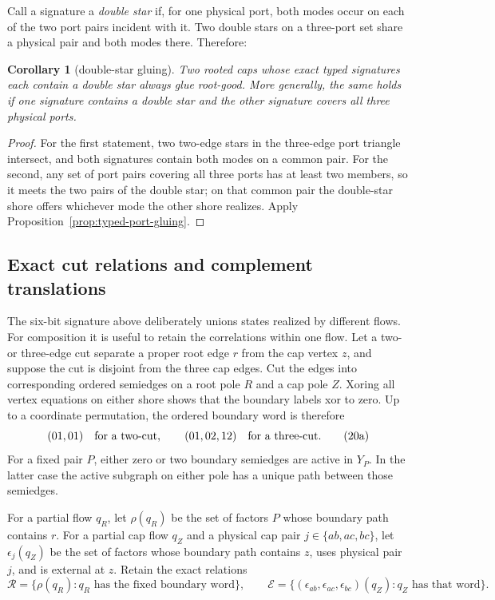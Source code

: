 \documentclass[11pt]{article}
\newtheorem{corollary}[theorem]{Corollary}
\theoremstyle{definition}
\theoremstyle{remark}
\begin{document}
Call a signature a \emph{double star} if, for one physical port, both modes
occur on each of the two port pairs incident with it.  Two double stars on
a three-port set share a physical pair and both modes there.  Therefore:

\begin{corollary}[double-star gluing]\label{cor:double-star-gluing}
Two rooted caps whose exact typed signatures each contain a double star
always glue root-good.  More generally, the same holds if one signature
contains a double star and the other signature covers all three physical
ports.
\end{corollary}

\begin{proof}
For the first statement, two two-edge stars in the three-edge port triangle
intersect, and both signatures contain both modes on a common pair.  For
the second, any set of port pairs covering all three ports has at least two
members, so it meets the two pairs of the double star; on that common pair
the double-star shore offers whichever mode the other shore realizes.
Apply Proposition~\ref{prop:typed-port-gluing}.
\end{proof}

\subsection{Exact cut relations and complement translations}

The six-bit signature above deliberately unions states realized by different
flows.  For composition it is useful to retain the correlations within one
flow.  Let a two- or three-edge cut separate a proper root edge \(r\) from
the cap vertex \(z\), and suppose the cut is disjoint from the three cap
edges.  Cut the edges into corresponding ordered semiedges on a root pole
\(R\) and a cap pole \(Z\).  Xoring all vertex equations on either shore
shows that the boundary labels xor to zero.  Up to a coordinate permutation,
the ordered boundary word is therefore
\[
       (01,01)\quad\hbox{for a two-cut},\qquad
       (01,02,12)\quad\hbox{for a three-cut}.                \tag{20a}
\]
For a fixed pair \(P\), either zero or two boundary semiedges are active in
\(Y_P\).  In the latter case the active subgraph on either pole has a unique
path between those semiedges.

For a partial flow \(q_R\), let \(\rho(q_R)\) be the set of factors \(P\)
whose boundary path contains \(r\).  For a partial cap flow \(q_Z\) and a
physical cap pair \(j\in\{ab,ac,bc\}\), let \(\epsilon_j(q_Z)\) be the set
of factors whose boundary path contains \(z\), uses physical pair \(j\),
and is external at \(z\).  Retain the exact relations
\[
 \mathcal R=\{\rho(q_R):q_R\text{ has the fixed boundary word}\},
 \qquad
 \mathcal E=\{(\epsilon_{ab},\epsilon_{ac},\epsilon_{bc})(q_Z):
 q_Z\text{ has that word}\}.                               \tag{20b}
\]
\end{document}
